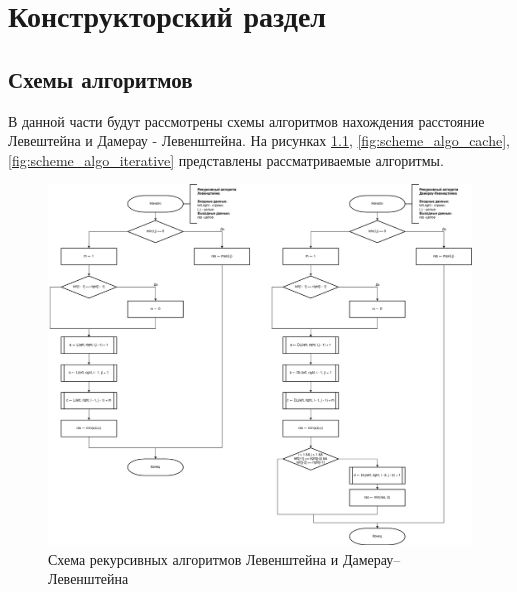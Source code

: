 \chapter{Конструкторский раздел}
\label{cha:design}

\section{Схемы алгоритмов}
В данной части будут рассмотрены схемы алгоритмов нахождения расстояние Левештейна и Дамерау - Левенштейна. На рисунках \ref{fig:scheme_algo_recursive}, \ref{fig:scheme_algo_cache}, \ref{fig:scheme_algo_iterative} представлены рассматриваемые алгоритмы.


\begin{figure}[h]
    \centering
    \includegraphics[width=1\columnwidth]{img/flowcharts/1.png}
    \caption{Схема рекурсивных алгоритмов Левенштейна и Дамерау--Левенштейна}
    \label{fig:scheme_algo_recursive}
\end{figure} 

